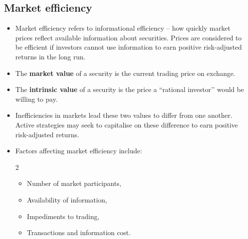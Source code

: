 \documentclass[../notes_compiled.tex]{subfiles}
\begin{document}
\subsection{Market efficiency}
\begin{itemize}
\item Market efficiency refers to informational efficiency -- how quickly market prices reflect available information about securities. Prices are considered to be efficient if investors cannot use information to earn positive risk-adjusted returns in the long run.
\item The \textbf{market value} of a security is the current trading price on exchange.
\item The \textbf{intrinsic value} of a security is the price a ``rational investor’’ would be willing to pay.
\item Inefficiencies in markets lead these two values to differ from one another. Active strategies may seek to capitalise on these difference to earn positive risk-adjusted returns.
\item Factors affecting market efficiency include:
\begin{multicols}{2}
\begin{itemize}
\item Number of market participants,
\item Availability of information,
\item Impediments to trading,
\item Transactions and information cost.
\end{itemize}
\end{multicols}

\end{itemize}
\end{document}
